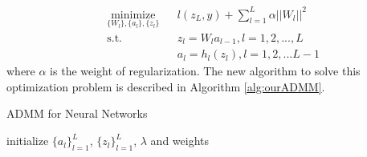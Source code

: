 \documentclass[letterpaper, 10 pt, conference]{ieeeconf}  %
\begin{document}
\begin{equation}
\begin{aligned} 
& \underset{\{W_l\},\{a_l\}, \{z_l\}}{\text{minimize}}
& & l(z_L,y) + \sum_{l=1}^L \alpha ||W_l||^2 \\
& \text{s.t.}
& & z_l = W_la_{l-1},  l = 1,2,...,L \\
& & & a_l = h_l(z_l),  l = 1,2,...L-1 \label{eq:modelWithReg}
\end{aligned}
\end{equation}
where $\alpha$ is the weight of regularization. The new algorithm to solve this optimization problem is described in Algorithm \ref{alg:ourADMM}.
\begin{algorithm} 
\caption{ADMM for Neural Networks}
\label{alg:ourADMM}
initialize $\{a_l\}^{L}_{l=1}$, $\{z_l\}^{L}_{l=1}$, $\lambda$ and weights\\

\end{algorithm}
\end{document}
